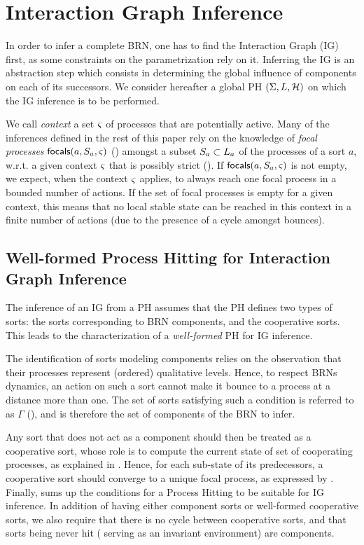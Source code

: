 \section{Interaction Graph Inference}\label{sec:infer-IG}

In order to infer a complete BRN, one has to find the Interaction Graph (IG) first, as some
constraints on the parametrization rely on it.
Inferring the IG is an abstraction step which consists in determining the global influence of
components on each of its successors.
We consider hereafter a global PH $(\Sigma,L,\mathcal{H})$ on which the IG inference is to be
performed.

We call \emph{context} a set $\varsigma$ of processes that are potentially active.
Many of the inferences defined in the rest of this paper rely on the knowledge of \emph{focal
processes} $\mathsf{focals}(a,S_a,\varsigma)$ () amongst a subset $S_a \subset L_a$ of the processes of a sort $a$, w.r.t. a given context $\varsigma$ that is possibly strict ().
If $\mathsf{focals}(a,S_a,\varsigma)$ is not empty, we expect, when the context $\varsigma$ applies, to always reach one focal process in a bounded number of actions.
If the set of focal processes is empty for a given context, this means that no local stable state can be reached in this context in a finite number of actions (due to the presence of a cycle amongst bounces).

\subsection{Well-formed Process Hitting for Interaction Graph Inference}\label{ssec:wf}

The inference of an IG from a PH assumes that the PH defines two types of sorts:
the sorts corresponding to BRN components, and the cooperative sorts.
This leads to the characterization of a \emph{well-formed} PH for IG inference.

The identification of sorts modeling components relies on the observation that their processes
represent (ordered) qualitative levels.
Hence, to respect BRNs dynamics, an action on such a sort cannot make it bounce to a process at a distance more than one.
The set of sorts satisfying such a condition is referred to as $\Gamma$
(), and is therefore the set of components of the BRN to infer.

Any sort that does not act as a component should then be treated as a cooperative sort, whose role is to compute the current state of set of cooperating processes, as explained in .
Hence, for each sub-state of its predecessors, a cooperative sort should converge to a unique focal process, as expressed by .
Finally,  sums up the conditions for a Process Hitting to be suitable for IG inference.
In addition of having either component sorts or well-formed cooperative sorts, we also require that there is no cycle between cooperative sorts, and that sorts being never hit (\ie{} serving as an invariant environment) are components.

